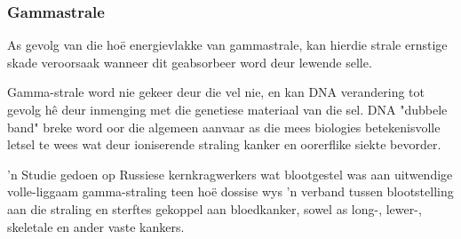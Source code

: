             \subsubsection*{Gammastrale}
            \nopagebreak
        \label{m38779*id189632}As gevolg van die ho\"e energievlakke van gammastrale, kan hierdie strale ernstige skade veroorsaak wanneer dit geabsorbeer word deur lewende selle. \par 
        \label{m38779*id189636}Gamma-strale word nie gekeer deur die vel nie, en kan DNA verandering tot gevolg h\^e deur inmenging met die genetiese materiaal van die sel. DNA "dubbele band" breke word oor die algemeen aanvaar as die mees biologies betekenisvolle letsel te wees wat deur ioniserende straling kanker en oorerflike siekte bevorder. \par 
        \label{m38779*id189642} 'n Studie gedoen op Russiese kernkragwerkers wat blootgestel was aan uitwendige volle-liggaam gamma-straling teen ho\"e dossise wys 'n verband tussen blootstelling aan die straling en sterftes gekoppel aan bloedkanker, sowel as long-, lewer-, skeletale en ander vaste kankers. \par 
      \label{m38779*eip-665}


